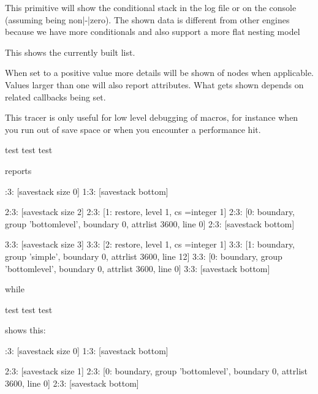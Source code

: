 \stopoldprimitive

\startoldprimitive[title={\prm {showifs}}]

This primitive will show the conditional stack in the log file or on the console
(assuming  being non|-|zero). The shown data is different
from other engines because we have more conditionals and also support a more flat
nesting model

\stopoldprimitive

\startoldprimitive[title={\prm {showlists}}]

This shows the currently built list.

\stopoldprimitive

\startoldprimitive[title={\prm {shownodedetails}}]

When set to a positive value more details will be shown of nodes when applicable.
Values larger than one will also report attributes. What gets shown depends on
related callbacks being set.

\stopoldprimitive

\startoldprimitive[title={\prm {showstack}}]

This tracer is only useful for low level debugging of macros, for instance when
you run out of save space or when you encounter a performance hit.

\starttyping
  test \showstack
 {test \showstack}
{{test \showstack}}
\stoptyping

reports

:3: [savestack size 0]
1:3: [savestack bottom]

2:3: [savestack size 2]
2:3: [1: restore, level 1, cs \scratchcounter=integer 1]
2:3: [0: boundary, group 'bottomlevel', boundary 0, attrlist 3600, line 0]
2:3: [savestack bottom]

3:3: [savestack size 3]
3:3: [2: restore, level 1, cs \scratchcounter=integer 1]
3:3: [1: boundary, group 'simple', boundary 0, attrlist 3600, line 12]
3:3: [0: boundary, group 'bottomlevel', boundary 0, attrlist 3600, line 0]
3:3: [savestack bottom]
\stoptyping

while

\starttyping
  test \showstack
 {test \showstack}
{{test \showstack}}
\stoptyping

shows this:

:3: [savestack size 0]
1:3: [savestack bottom]

2:3: [savestack size 1]
2:3: [0: boundary, group 'bottomlevel', boundary 0, attrlist 3600, line 0]
2:3: [savestack bottom]

